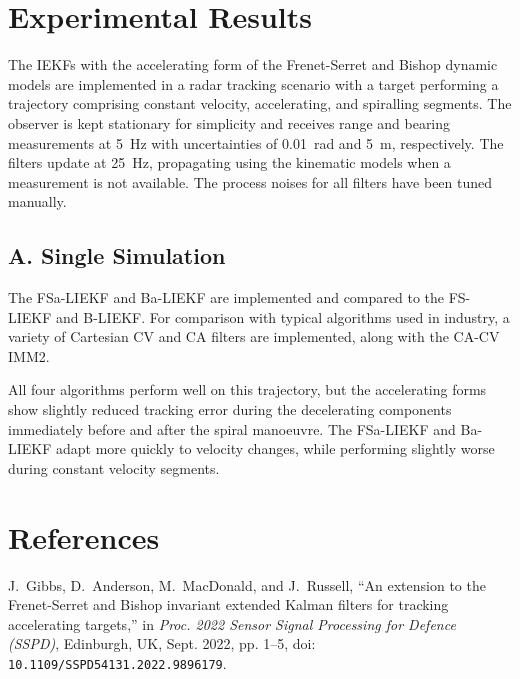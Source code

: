 \documentclass[11pt]{article}
\begin{document}
\section{Experimental Results}

The IEKFs with the accelerating form of the Frenet-Serret and Bishop dynamic models are implemented in a radar tracking scenario with a target performing a trajectory comprising constant velocity, accelerating, and spiralling segments. The observer is kept stationary for simplicity and receives range and bearing measurements at 5~Hz with uncertainties of 0.01~rad and 5~m, respectively. The filters update at 25~Hz, propagating using the kinematic models when a measurement is not available. The process noises for all filters have been tuned manually.

\subsection*{A. Single Simulation}

The FSa-LIEKF and Ba-LIEKF are implemented and compared to the FS-LIEKF and B-LIEKF. For comparison with typical algorithms used in industry, a variety of Cartesian CV and CA filters are implemented, along with the CA-CV IMM2.

All four algorithms perform well on this trajectory, but the accelerating forms show slightly reduced tracking error during the decelerating components immediately before and after the spiral manoeuvre. The FSa-LIEKF and Ba-LIEKF adapt more quickly to velocity changes, while performing slightly worse during constant velocity segments.

\section*{References}


\begin{thebibliography}{1}

    J.~Gibbs, D.~Anderson, M.~MacDonald, and J.~Russell,
    ``An extension to the Frenet-Serret and Bishop invariant extended Kalman filters for tracking accelerating targets,'' 
    in \emph{Proc. 2022 Sensor Signal Processing for Defence (SSPD)}, Edinburgh, UK, Sept. 2022, pp. 1--5, doi: \texttt{10.1109/SSPD54131.2022.9896179}.
    
\end{thebibliography}
\end{document}
